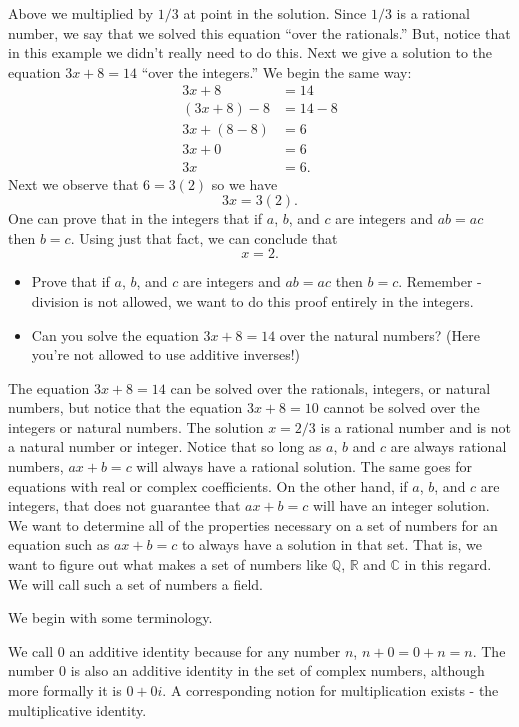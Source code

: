 \documentclass[11pt]{article}
\newenvironment{task}
	{\begin{mdframed}[linecolor=lightgray, linewidth=3pt]\raggedright}
	{\end{mdframed}}
\theoremstyle{definition}
\begin{document}
Above we multiplied by $1/3$ at point in the solution. Since $1/3$ is a rational number, we say that we solved this equation ``over the
rationals.'' But, notice that in this example we didn't really need to do this. Next we give a solution to the equation $3x+8=14$ ``over the
integers.'' We begin the same way:
\begin{align*}
  3x + 8 &= 14\\
 (3x+8)-8 &= 14 -8\\
 3x + (8-8) &= 6\\
 3x + 0 &= 6\\
 3x &= 6.
\end{align*}
Next we observe that $6 = 3(2)$ so we have
\[ 3x = 3(2).\]
One can prove that in the integers that if $a$, $b$, and $c$ are integers and $ab=ac$ then $b=c$. Using just that fact, we can conclude that
\[ x = 2.\]

\begin{task}
  \begin{itemize}
    \item Prove that if $a$, $b$, and $c$ are integers and $ab = ac$ then $b=c$. Remember - division is not allowed, we want to do this
      proof entirely in the integers.
    \item Can you solve the equation $3x+8=14$ over the natural numbers? (Here you're not allowed to use additive inverses!)
  \end{itemize}
\end{task}

The equation $3x+8=14$ can be solved over the rationals, integers, or natural numbers, but notice that the equation $3x+8=10$ cannot be solved over
the integers or natural numbers. The solution $x=2/3$ is a rational number and is not a natural number or integer. Notice that so long as $a$, $b$ and
$c$ are always rational numbers, $ax+b=c$ will always have a rational solution.  The same goes for equations with real or complex coefficients. On the
other hand, if $a$, $b$, and $c$ are integers, that does not guarantee that $ax+b=c$ will have an integer solution. We want to determine all of the 
properties necessary on a set of numbers for an equation such as $ax+b=c$ to always have a solution in that set. That is, we want to figure out
what makes a set of numbers like $\mathbb{Q}$, $\mathbb{R}$ and $\mathbb{C}$ in this regard. We will call such a set of numbers a field.

We begin with some terminology.

We call $0$ an additive identity because for any number $n$, $n+0 = 0 + n = n$. The number $0$ is also an additive identity in the set of complex numbers,
although more formally it is $0+0i$. A corresponding notion for multiplication exists - the multiplicative identity.
\end{document}
